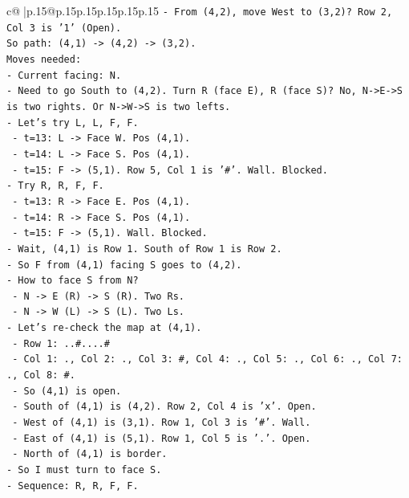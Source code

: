 \documentclass{article}
\begin{document}
{\begin{supertabular}{c@{$\;$}|p{.15\linewidth}@{}p{.15\linewidth}p{.15\linewidth}p{.15\linewidth}p{.15\linewidth}p{.15\linewidth}}
{{{\texttt{{-} From (4,2), move West to (3,2)? Row 2, Col 3 is '1' (Open).} \\
\texttt{So path: (4,1) {-}> (4,2) {-}> (3,2).} \\
\texttt{Moves needed:} \\
\texttt{{-} Current facing: N.} \\
\texttt{{-} Need to go South to (4,2). Turn R (face E), R (face S)? No, N{-}>E{-}>S is two rights. Or N{-}>W{-}>S is two lefts.} \\
\texttt{{-} Let's try L, L, F, F.} \\
\texttt{  {-} t=13: L {-}> Face W. Pos (4,1).} \\
\texttt{  {-} t=14: L {-}> Face S. Pos (4,1).} \\
\texttt{  {-} t=15: F {-}> (5,1). Row 5, Col 1 is '\#'. Wall. Blocked.} \\
\texttt{{-} Try R, R, F, F.} \\
\texttt{  {-} t=13: R {-}> Face E. Pos (4,1).} \\
\texttt{  {-} t=14: R {-}> Face S. Pos (4,1).} \\
\texttt{  {-} t=15: F {-}> (5,1). Wall. Blocked.} \\
\texttt{{-} Wait, (4,1) is Row 1. South of Row 1 is Row 2.} \\
\texttt{{-} So F from (4,1) facing S goes to (4,2).} \\
\texttt{{-} How to face S from N?} \\
\texttt{  {-} N {-}> E (R) {-}> S (R). Two Rs.} \\
\texttt{  {-} N {-}> W (L) {-}> S (L). Two Ls.} \\
\texttt{{-} Let's re{-}check the map at (4,1).} \\
\texttt{  {-} Row 1: ..\#....\#} \\
\texttt{  {-} Col 1: ., Col 2: ., Col 3: \#, Col 4: ., Col 5: ., Col 6: ., Col 7: ., Col 8: \#.} \\
\texttt{  {-} So (4,1) is open.} \\
\texttt{  {-} South of (4,1) is (4,2). Row 2, Col 4 is 'x'. Open.} \\
\texttt{  {-} West of (4,1) is (3,1). Row 1, Col 3 is '\#'. Wall.} \\
\texttt{  {-} East of (4,1) is (5,1). Row 1, Col 5 is '.'. Open.} \\
\texttt{  {-} North of (4,1) is border.} \\
\texttt{{-} So I must turn to face S.} \\
\texttt{{-} Sequence: R, R, F, F.} \\
}}}
\end{supertabular}}
\end{document}

